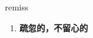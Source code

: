 
\begin{frame}
{\huge remiss}
\begin{center}
\begin{enumerate}\Large
  \item \textbf{疏忽的，不留心的}
\end{enumerate}
\end{center}
\end{frame}
